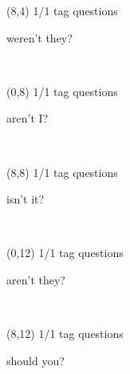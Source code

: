 \documentclass[a4paper]{article}
\newcommand{\mycard}[5]{%
	\vspace{0.1cm}
	\small #1 #2
	\par
	\parbox[t][6.7cm][c]{9.5cm}{%
	\hspace{0.1cm} \Large#3\\
	\normalsize#4 #5
	}
}
\begin{document}
\begin{textblock}{8}(8,4)
\mycard{1/1}{tag questions}{\parbox{9.0cm}{
weren't they?
}}{}{} 
\end{textblock}

\begin{textblock}{8}(0,8)
\mycard{1/1}{tag questions}{\parbox{9.0cm}{
aren't I?
}}{}{} 
\end{textblock}

\begin{textblock}{8}(8,8)
\mycard{1/1}{tag questions}{\parbox{9.0cm}{
isn't it?
}}{}{} 
\end{textblock}

\begin{textblock}{8}(0,12)
\mycard{1/1}{tag questions}{\parbox{9.0cm}{
aren't they?
}}{}{} 
\end{textblock}

\begin{textblock}{8}(8,12)
\mycard{1/1}{tag questions}{\parbox{9.0cm}{
should you?
}}{}{} 
\end{textblock}
\end{document}
